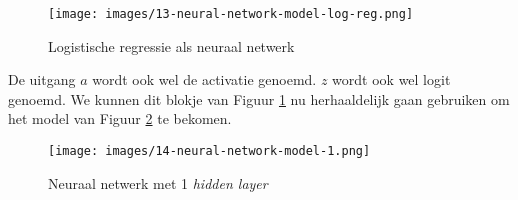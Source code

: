 \begin{figure}[h]
	\centering
	\texttt{[image: images/13-neural-network-model-log-reg.png]}
	\caption{Logistische regressie als neuraal netwerk}
	\label{fig:neural-network-model-log-reg}
\end{figure}
\noindent
De uitgang $a$ wordt ook wel de activatie genoemd. $z$ wordt ook wel logit genoemd. We kunnen dit blokje van Figuur \ref{fig:neural-network-model-log-reg} nu herhaaldelijk gaan gebruiken om het model van Figuur \ref{fig:neural-network-model-1} te bekomen. 

\begin{figure}[h]
	\centering
	\texttt{[image: images/14-neural-network-model-1.png]}
	\caption{Neuraal netwerk met 1 \textit{hidden layer}}
	\label{fig:neural-network-model-1}
\end{figure}

